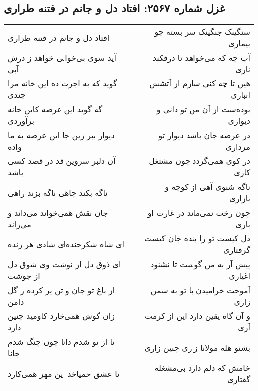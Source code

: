 \begin{center}
\section*{غزل شماره ۲۵۶۷: افتاد دل و جانم در فتنه طراری}
\label{sec:2567}
\begin{longtable}{l p{0.5cm} r}
افتاد دل و جانم در فتنه طراری
&&
سنگینک جنگینک سر بسته چو بیماری
\\
آید سوی بی‌خوابی خواهد ز درش آبی
&&
آب چه که می‌خواهد تا درفکند ناری
\\
گوید که به اجرت ده این خانه مرا چندی
&&
هین تا چه کنی سازم از آتشش انباری
\\
گه گوید این عرصه کاین خانه برآوردی
&&
بوده‌ست از آن من تو دانی و دیواری
\\
دیوار ببر زین جا این عرصه به ما واده
&&
در عرصه جان باشد دیوار تو مرداری
\\
آن دلبر سروین قد در قصد کسی باشد
&&
در کوی همی‌گردد چون مشتغل کاری
\\
ناگه بکند چاهی ناگه بزند راهی
&&
ناگه شنوی آهی از کوچه و بازاری
\\
جان نقش همی‌خواند می‌داند و می‌راند
&&
چون رخت نمی‌ماند در غارت او باری
\\
ای شاه شکرخنده‌ای شادی هر زنده
&&
دل کیست تو را بنده جان کیست گرفتاری
\\
ای ذوق دل از نوشت وی شوق دل از جوشت
&&
پیش آر به من گوشت تا نشنود اغیاری
\\
از باغ تو جان و تن پر کرده ز گل دامن
&&
آموخت خرامیدن با تو به سمن زاری
\\
زان گوش همی‌خارد کاومید چنین دارد
&&
و آن گاه یقین دارد این از کرمت آری
\\
تا از تو شدم دانا چون چنگ شدم جانا
&&
بشنو هله مولانا زاری چنین زاری
\\
تا عشق حمیاخد این مهر همی‌کارد
&&
خامش که دلم دارد بی‌مشغله گفتاری
\\
\end{longtable}
\end{center}
